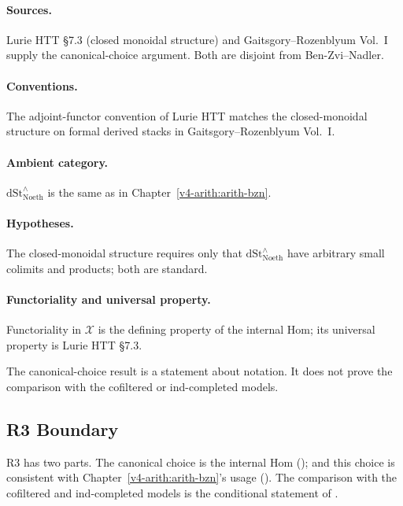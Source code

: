 \paragraph{Sources.} Lurie HTT \S 7.3 (closed monoidal structure)
and Gaitsgory--Rozenblyum Vol.~I supply the canonical-choice argument.
Both are disjoint from Ben-Zvi--Nadler.

\paragraph{Conventions.} The adjoint-functor convention of Lurie HTT
matches the closed-monoidal structure on formal derived stacks
in Gaitsgory--Rozenblyum Vol.~I.

\paragraph{Ambient category.} \(\mathrm{dSt}^{\wedge}_{\mathrm{Noeth}}\)
is the same as in Chapter~\ref{v4-arith:arith-bzn}.

\paragraph{Hypotheses.} The closed-monoidal
structure requires only that \(\mathrm{dSt}^{\wedge}_{\mathrm{Noeth}}\)
have arbitrary small colimits and products; both are standard.

\paragraph{Functoriality and universal property.}
Functoriality in \(\mathcal{X}\) is the defining property of the
internal Hom; its universal property is Lurie HTT \S 7.3.

The canonical-choice result
 is a statement
about notation. It does not prove the comparison with the cofiltered
or ind-completed models.

\subsection{R3 Boundary}

R3 has two parts. The canonical choice is the internal Hom
(); and this
choice is consistent with Chapter~\ref{v4-arith:arith-bzn}'s
usage (). The
comparison with the cofiltered and ind-completed models is the
conditional statement of
.

